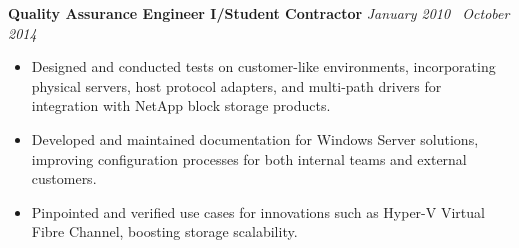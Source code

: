 \documentclass[10pt]{article}       %
\begin{document}
\textbf{Quality Assurance Engineer I/Student Contractor} \hfill \textit{January 2010 \textendash\ October 2014} \\
\vspace{-6.5pt}
\begin{itemize}
  \item Designed and conducted tests on customer-like environments, incorporating physical servers, host protocol adapters, and multi-path drivers for integration with NetApp block storage products.
  \item Developed and maintained documentation for Windows Server solutions, improving configuration processes for both internal teams and external customers.
  \item Pinpointed and verified use cases for innovations such as Hyper-V Virtual Fibre Channel, boosting storage scalability.
\end{itemize}



\end{document}
